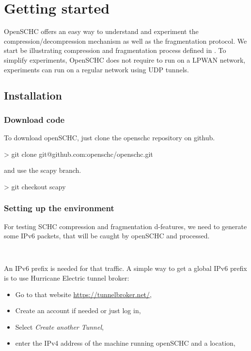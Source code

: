 \chapter{Getting started}

OpenSCHC offers an easy way to understand and experiment the compression/decompression mechanism as well as the fragmentation protocol. We start be illustrating compression and fragmentation process defined in . To simplify experiments, OpenSCHC does not require to run on a LPWAN network, experiments can run on a regular network using UDP tunnels.


\section{Installation}\label{chap-plat}

\subsection{Download code}

To download openSCHC, just clone the openschc repository on github.


\begin{termc}[backgroundcolor=\color{palerod}, basicstyle=\ttfamily\small]
> git clone git@github.com:openschc/openschc.git
\end{termc}

and use the scapy branch.

\begin{termc}[backgroundcolor=\color{palerod}, basicstyle=\ttfamily\small, escapechar=@]
> git checkout scapy
\end{termc}

\subsection{Setting up the environment}

For testing SCHC compression and fragmentation d-features, we need to generate some IPv6 packets, that will be caught by openSCHC and processed. 

~

An IPv6 prefix is needed for that traffic. A simple way to get a global IPv6 prefix is to use Hurricane Electric tunnel broker:
\begin{itemize}
\item Go to that website \url{https://tunnelbroker.net/}, 
\item Create an account if needed or just log in, 
\item Select \textit{Create another Tunnel},
\item enter the IPv4 address of the machine running openSCHC and a location,
\end{itemize}

